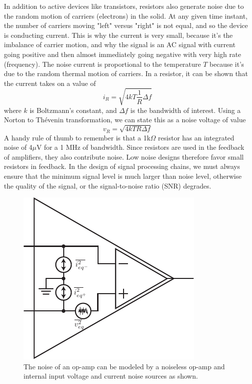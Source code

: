 In addition to active devices like transistors, resistors also generate noise due to the random motion of carriers (electrons) in the solid.  At any given time instant, the number of carriers moving "left" versus "right" is not equal, and so the device is conducting current. This is why the current is very small, because it's the imbalance of carrier motion, and why the signal is an AC signal with current going positive and then almost immediately going negative with very high rate (frequency).  The noise current is proportional to the temperature $T$ because it's due to the random thermal motion of carriers.  In a resistor, it can be shown that the current takes on a value of
    \begin{equation}
        i_R = \sqrt{4 k T \frac{1}{R} \Delta f} 
    \end{equation}
where $k$ is Boltzmann's constant, and $\Delta f$ is the bandwidth of interest.   Using a Norton to Thévenin transformation, we can state this as a noise voltage of value
    \begin{equation}
        v_R = \sqrt{4 k T R \Delta f} 
    \end{equation}
A handy rule of thumb to remember is that a 1k$\Omega$ resistor has an integrated noise of 4$\mu$V for a 1 MHz of bandwidth.   Since resistors are used in the feedback of amplifiers, they also contribute noise. Low noise designs therefore favor small resistors in feedback.  In the design of signal processing chains, we must always ensure that the minimum signal level is much larger than noise level, otherwise the quality of the signal, or the signal-to-noise ratio (SNR) degrades.
\begin{figure}[tb]
\centering
\includegraphics[scale=1]{opamp_noise}
\caption{The noise of an op-amp can be modeled by a noiseless op-amp and internal input voltage and current noise sources as shown.}
\label{fig:opamp_noise}
\end{figure}
